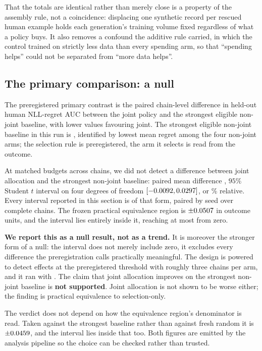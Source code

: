 That the totals are identical rather than merely close is a property of the assembly rule,
not a coincidence: displacing one synthetic record per rescued human example holds each
generation's training volume fixed regardless of what a policy buys. It also removes a
confound the additive rule carried, in which the control trained on strictly less data than
every spending arm, so that ``spending helps'' could not be separated from ``more data
helps''.

\subsection{The primary comparison: a null}

The preregistered primary contrast is the paired chain-level difference in held-out human
NLL-regret AUC between the joint policy and the strongest eligible non-joint baseline, with
lower values favouring joint. The strongest eligible non-joint baseline in this run is
\PilotPrimaryBaseline{}, identified by lowest mean regret among the four non-joint arms;
the selection rule is preregistered, the arm it selects is read from the outcome.

At matched budgets across \PilotChains{} chains, we did not detect a difference between
joint allocation and the strongest non-joint baseline: paired mean difference
\PilotPrimaryMean{}, $95\%$ Student $t$ interval on four degrees of freedom
$[-0.0092, 0.0297]$, or \PilotPrimaryPct\% relative. Every interval
reported in this section is of that form, paired by seed over complete chains. The frozen practical equivalence region is
$\pm0.0507{}$ in outcome units, and the interval lies entirely inside it,
reaching at most \PilotPrimaryReach{} from zero.

\textbf{We report this as a null result, not as a trend.} It is moreover the stronger form
of a null: the interval does not merely include zero, it excludes every difference the
preregistration calls practically meaningful. The design is powered to detect effects at
the preregistered threshold with roughly three chains per arm, and it ran with
\PilotSeeds{}. The claim that joint allocation improves on the strongest non-joint baseline
is \textbf{not supported}. Joint allocation is not shown to be worse either; the finding is
practical equivalence to selection-only.

The verdict does not depend on how the equivalence region's denominator is read. Taken
against the strongest baseline rather than against fresh random it is
$\pm0.0459{}$, and the interval lies inside that too. Both figures are
emitted by the analysis pipeline so the choice can be checked rather than trusted.

